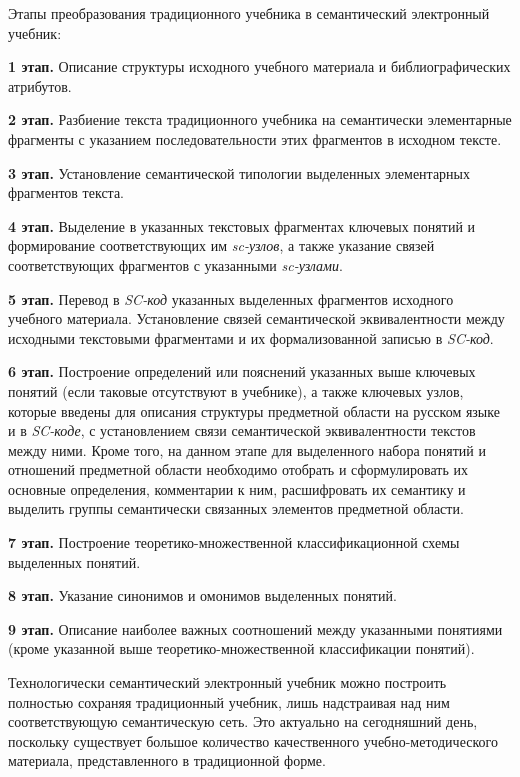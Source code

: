 Этапы преобразования традиционного учебника в семантический электронный учебник:

\textbf{1 этап.} Описание структуры исходного учебного материала и библиографических атрибутов.

\textbf{2 этап.} Разбиение текста традиционного учебника на семантически элементарные фрагменты с указанием последовательности этих фрагментов в исходном тексте.

\textbf{3 этап.} Установление семантической типологии выделенных элементарных фрагментов текста.

\textbf{4 этап.} Выделение в указанных текстовых фрагментах ключевых понятий и формирование соответствующих им \textit{sc-узлов}, а также указание связей соответствующих фрагментов с указанными \textit{sc-узлами}.

\textbf{5 этап.} Перевод в \textit{SC-код} указанных выделенных фрагментов исходного учебного материала. Установление связей семантической эквивалентности между исходными текстовыми фрагментами и их формализованной записью в \textit{SC-код}.

\textbf{6 этап.} Построение определений или пояснений указанных выше ключевых понятий (если таковые отсутствуют в учебнике), а также ключевых узлов, которые введены для описания структуры предметной области на русском языке и в \textit{SC-коде}, с установлением связи семантической эквивалентности текстов между ними. Кроме того, на данном этапе для выделенного набора понятий и отношений предметной области необходимо отобрать и сформулировать их основные определения, комментарии к ним, расшифровать их семантику и выделить группы семантически связанных элементов предметной области.

\textbf{7 этап.} Построение теоретико-множественной классификационной схемы выделенных понятий.

\textbf{8 этап.} Указание синонимов и омонимов выделенных понятий.

\textbf{9 этап.} Описание наиболее важных соотношений между указанными понятиями (кроме указанной выше теоретико-множественной классификации понятий).

Технологически семантический электронный учебник можно построить полностью сохраняя традиционный учебник, лишь надстраивая над ним соответствующую семантическую сеть. Это актуально на сегодняшний день, поскольку существует большое количество качественного учебно-методического материала, представленного в традиционной форме.

\begin{SCn}
	\begin{scnsdclass}
	\end{scnsdclass}
\end{SCn}


